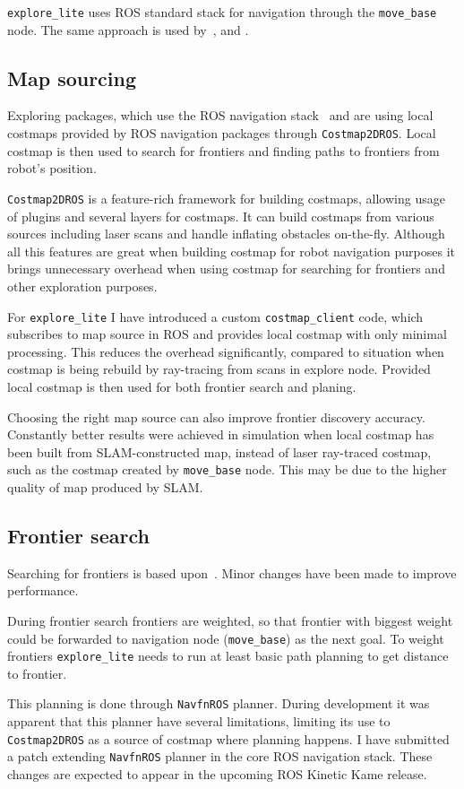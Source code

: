 \texttt{explore\_lite} uses \gls{ROS} standard stack for navigation through the \texttt{move\_base} node. The same approach is used by~\cite{DuHadway2010}, \cite{Bovbel2010} and \cite{Andre2014}.

\subsection{Map sourcing}

Exploring packages, which use the \gls{ROS} navigation stack~\cite{Bovbel2010} and \cite{DuHadway2010} are using local costmaps provided by \gls{ROS} navigation packages through \texttt{Cost\-map\-2D\-ROS}. Local costmap is then used to search for frontiers and finding paths to frontiers from robot's position.

\texttt{Costmap2DROS} is a feature-rich framework for building costmaps, allowing usage of plugins and several layers for costmaps. It can build costmaps from various sources including laser scans and handle inflating obstacles on-the-fly. Although all this features are great when building costmap for robot navigation purposes it brings unnecessary overhead when using costmap for searching for frontiers and other exploration purposes.

For \texttt{explore\_lite} I have introduced a custom \texttt{costmap\_client} code, which subscribes to map source in \gls{ROS} and provides local costmap with only minimal processing. This reduces the overhead significantly, compared to situation when costmap is being rebuild by ray-tracing from scans in explore node. Provided local costmap is then used for both frontier search and planing.

Choosing the right map source can also improve frontier discovery accuracy. Constantly better results were achieved in simulation when local costmap has been built from \gls{SLAM}-constructed map, instead of laser ray-traced costmap, such as the costmap created by \texttt{move\_base} node. This may be due to the higher quality of map produced by \gls{SLAM}.

\subsection{Frontier search}

Searching for frontiers is based upon~\cite{DuHadway2010}. Minor changes have been made to improve performance.

During frontier search frontiers are weighted, so that frontier with biggest weight could be forwarded to navigation node (\texttt{move\_base}) as the next goal. To weight frontiers \texttt{explore\_lite} needs to run at least basic path planning to get distance to frontier.

This planning is done through \texttt{NavfnROS} planner. During development it was apparent that this planner have several limitations, limiting its use to \texttt{Cost\-map\-2D\-ROS} as a source of costmap where planning happens. I have submitted a patch extending \texttt{NavfnROS} planner in the core \gls{ROS} navigation stack. These changes are expected to appear in the upcoming \gls{ROS} Kinetic Kame release.


